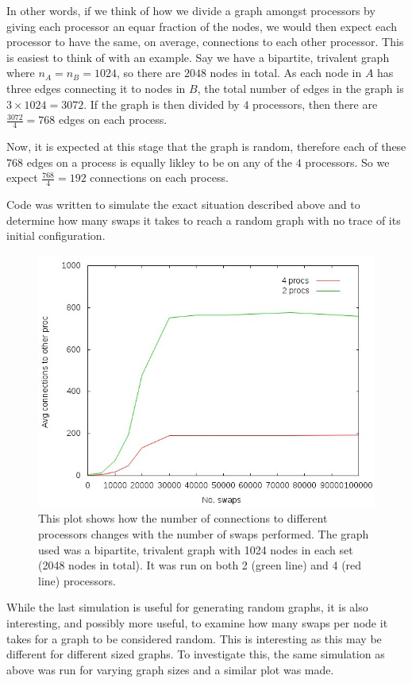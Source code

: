 \documentclass[pdftex,12pt,a4paper]{article}
\begin{document}
In other words, if we think of how we divide a graph amongst processors by giving each processor an equar fraction of the nodes, we would then expect each processor to have the same, on average, connections to each other processor. This is easiest to think of with an example. Say we have a bipartite, trivalent graph where $n_A = n_B = 1024$, so there are $2048$ nodes in total. As each node in $A$ has three edges connecting it to nodes in $B$, the total number of edges in the graph is $3 \times 1024 = 3072$. If the graph is then divided by $4$ processors, then there are $\frac{3072}{4} = 768$ edges on each process.

Now, it is expected at this stage that the graph is random, therefore each of these $768$ edges on a process is equally likley to be on any of the $4$ processors. So we expect $\frac{768}{4} = 192$ connections on each process.

Code was written to simulate the exact situation described above and to determine how many swaps it takes to reach a random graph with no trace of its initial configuration.

\begin{figure}
\centering
\includegraphics[scale=0.8]{swap_random_1024_by_2_nodegraph.jpg}
\caption{This plot shows how the number of connections to different processors changes with the number of swaps performed. The graph used was a bipartite, trivalent graph with 1024 nodes in each set (2048 nodes in total). It was run on both 2 (green line) and 4 (red line) processors.}
\end{figure}


While the last simulation is useful for generating random graphs, it is also interesting, and possibly more useful, to examine how many swaps per node it takes for a graph to be considered random. This is interesting as this may be different for different sized graphs. To investigate this, the same simulation as above was run for varying graph sizes and a similar plot was made.
\end{document}
